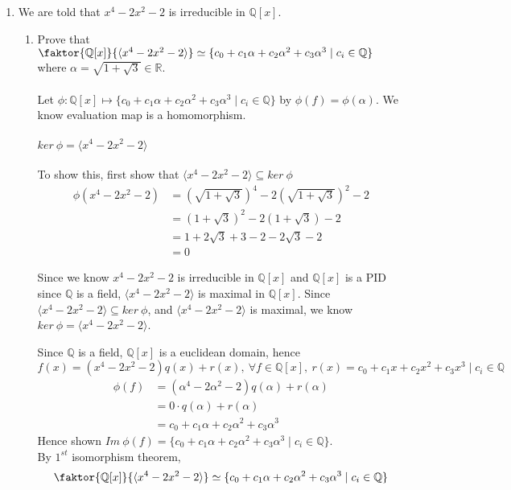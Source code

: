 \documentclass[12pt]{article}
\begin{document}
\begin{enumerate}
	\item We are told that $x^4 - 2x^2 - 2$ is irreducible in $\mathbb{Q}[x]$.
		\begin{enumerate}
			\item Prove that $\faktor{\mathbb{Q}[x]}{\langle x^4 - 2x^2 - 2\rangle}
				\simeq \{c_0 + c_1\alpha + c_2\alpha^2 + c_3\alpha^3 \mid c_i \in
				\mathbb{Q}\}$ where $\alpha = \sqrt{1 + \sqrt{3}} \in \mathbb{R}$.\\\\
				Let $\phi:\mathbb{Q}[x] \mapsto \{c_0 + c_1\alpha + c_2\alpha^2 +
				c_3\alpha^3 \mid c_i \in \mathbb{Q}\}$ by $\phi(f) = \phi(\alpha)$. We
				know evaluation map is a homomorphism.

				\paragraph{$ker\ \phi = \langle x^4 - 2x^2 - 2 \rangle$} To show this,
				first show that $\langle x^4 - 2x^2 - 2\rangle \subseteq ker\ \phi$
				\begin{align*}
					\phi(x^4 - 2x^2 - 2) &= \left(\sqrt{1+\sqrt{3}}\right)^4 -
																	2\left(\sqrt{1+\sqrt{3}}\right)^2 - 2 \\
															 &= (1+\sqrt{3})^2 - 2(1+\sqrt{3}) - 2\\
															 &= 1 +2\sqrt{3} + 3 - 2 - 2\sqrt{3} - 2\\
															 &= 0
				\end{align*}

				Since we know $x^4 - 2x^2 - 2$ is irreducible in $\mathbb{Q}[x]$ and
				$\mathbb{Q}[x]$ is a PID since $\mathbb{Q}$ is a field, $\langle x^4 -
				2x^2 - 2 \rangle$ is maximal in $\mathbb{Q}[x]$. Since $\langle x^4 -
				2x^2 - 2\rangle \subseteq ker\ \phi$, and $\langle x^4 - 2x^2 - 2
				\rangle$ is maximal, we know $ker\ \phi = \langle x^4 - 2x^2 - 2
				\rangle$.

				Since $\mathbb{Q}$ is a field, $\mathbb{Q}[x]$ is a euclidean domain,
				hence $f(x) = (x^4 - 2x^2 - 2)q(x) + r(x),\ \forall f \in
				\mathbb{Q}[x],\ r(x)=c_0 + c_1x + c_2x^2 + c_3x^3 \mid c_i \in
				\mathbb{Q}$
				\begin{align*}
					\phi(f) &= (\alpha^4 - 2\alpha^2 - 2)q(\alpha) + r(\alpha) \\
									&= 0 \cdot q(\alpha) + r(\alpha) \\
									&= c_0 + c_1\alpha + c_2\alpha^2 + c_3\alpha^3
				\end{align*}
				Hence shown $Im\ \phi(f) = \{c_0 + c_1\alpha + c_2\alpha^2 + c_3\alpha^3
				\mid c_i \in \mathbb{Q}\}$.\\
				By $1^{st}$ isomorphism theorem, 
				$$\faktor{\mathbb{Q}[x]}{\langle x^4 - 2x^2 - 2\rangle} \simeq \{c_0 +
					c_1\alpha + c_2\alpha^2 + c_3\alpha^3 \mid c_i \in \mathbb{Q}\}$$


\end{enumerate}
\end{enumerate}
\end{document}
